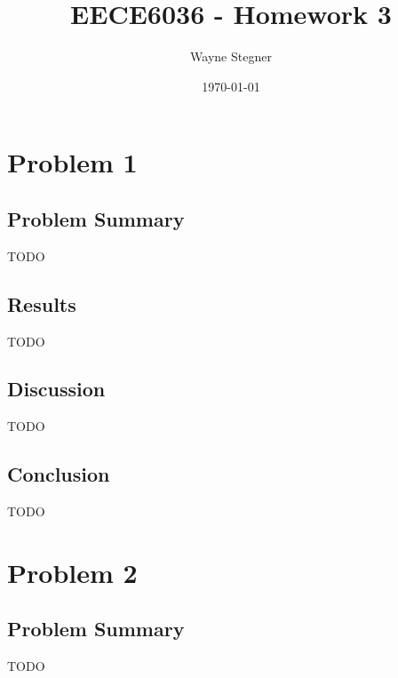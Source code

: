 \documentclass[a4paper, 11pt, titlepage]{article}
\title{EECE6036 - Homework 3}
\author{Wayne Stegner}
\date{\today}
\begin{document}
  \maketitle
  \section{Problem 1}
  \subsection{Problem Summary}
  \par TODO
  \subsection{Results}
  \par TODO
  \subsection{Discussion}
  \par TODO
  \subsection{Conclusion}
  \par TODO
  \pagebreak

  \section{Problem 2}
  \subsection{Problem Summary}
  \par TODO
\end{document}
